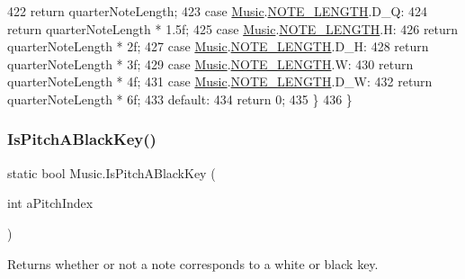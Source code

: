 \begin{DoxyCode}
422                 \textcolor{keywordflow}{return} quarterNoteLength;
423             \textcolor{keywordflow}{case} \hyperlink{class_music}{Music}.\hyperlink{group___music_enums_gaf11b5f079adbb21c800b9eca1c5c3cbd}{NOTE\_LENGTH}.D\_Q:
424                 \textcolor{keywordflow}{return} quarterNoteLength * 1.5f;
425             \textcolor{keywordflow}{case} \hyperlink{class_music}{Music}.\hyperlink{group___music_enums_gaf11b5f079adbb21c800b9eca1c5c3cbd}{NOTE\_LENGTH}.H:
426                 \textcolor{keywordflow}{return} quarterNoteLength * 2f;
427             \textcolor{keywordflow}{case} \hyperlink{class_music}{Music}.\hyperlink{group___music_enums_gaf11b5f079adbb21c800b9eca1c5c3cbd}{NOTE\_LENGTH}.D\_H:
428                 \textcolor{keywordflow}{return} quarterNoteLength * 3f;
429             \textcolor{keywordflow}{case} \hyperlink{class_music}{Music}.\hyperlink{group___music_enums_gaf11b5f079adbb21c800b9eca1c5c3cbd}{NOTE\_LENGTH}.W:
430                 \textcolor{keywordflow}{return} quarterNoteLength * 4f;
431             \textcolor{keywordflow}{case} \hyperlink{class_music}{Music}.\hyperlink{group___music_enums_gaf11b5f079adbb21c800b9eca1c5c3cbd}{NOTE\_LENGTH}.D\_W:
432                 \textcolor{keywordflow}{return} quarterNoteLength * 6f;
433             \textcolor{keywordflow}{default}:
434                 \textcolor{keywordflow}{return} 0;
435         \}
436     \}
\end{DoxyCode}
\mbox{\label{group___music_stat_func_gacc2c1a66df7197225f61c5737f794065}} 
\subsubsection{\texorpdfstring{Is\+Pitch\+A\+Black\+Key()}{IsPitchABlackKey()}\hspace{0.1cm}{\footnotesize\ttfamily [1/2]}}
{\footnotesize\ttfamily static bool Music.\+Is\+Pitch\+A\+Black\+Key (\begin{DoxyParamCaption}\item[{int}]{a\+Pitch\+Index }\end{DoxyParamCaption})\hspace{0.3cm}{\ttfamily [static]}}



Returns whether or not a note corresponds to a white or black key. 


